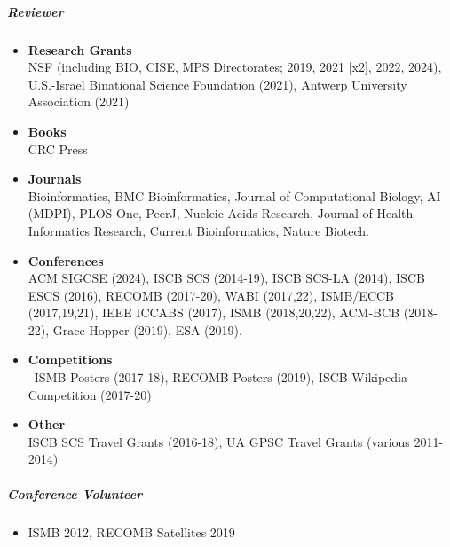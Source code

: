 \documentclass[10pt,letterpaper]{article}
\begin{document}
\subparagraph{Reviewer} 
\begin{itemize}%
    \item \textbf{Research Grants} \\ 
    	NSF (including BIO, CISE, MPS Directorates; 2019, 2021 [x2], 2022, 2024), 
	U.S.-Israel Binational Science Foundation (2021), 
	Antwerp University Association (2021)
    \item \textbf{Books} \\
    	CRC Press
    \item \textbf{Journals} \\
        Bioinformatics,
        BMC Bioinformatics, 
        Journal of Computational Biology,
        AI (MDPI), 
        PLOS One, 
        PeerJ, 
        Nucleic Acids Research, 
        Journal of Health Informatics Research,
        Current Bioinformatics,
        Nature Biotech.
    \item \textbf{Conferences} \\
    	ACM SIGCSE (2024),
        ISCB SCS (2014-19), %
        ISCB SCS-LA (2014), %
        ISCB ESCS (2016), %
	RECOMB (2017-20), %
	WABI (2017,22), %
	ISMB/ECCB (2017,19,21), %
    	IEEE ICCABS (2017), %
	ISMB (2018,20,22), %
	ACM-BCB (2018-22), %
	Grace Hopper (2019), %
	ESA (2019). %
     \item \textbf{Competitions} \\\
     	ISMB Posters (2017-18),
	RECOMB Posters (2019), 
     	ISCB Wikipedia Competition (2017-20)
     \item \textbf{Other} \\
         ISCB SCS Travel Grants (2016-18), 
         UA GPSC Travel Grants (various 2011-2014)
\end{itemize}

\subparagraph{Conference Volunteer}
\begin{itemize}
	\item ISMB 2012, RECOMB Satellites 2019
\end{itemize}
\end{document}
